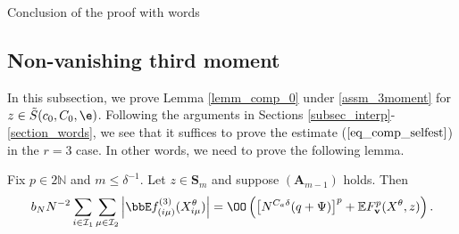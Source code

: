 \begin{subsection}{Conclusion of the proof with words}
\end{subsection}



\subsection{Non-vanishing third moment}\label{subsec_3moment}

In this subsection, we prove Lemma \ref{lemm_comp_0} under \eqref{assm_3moment} for $z\in \tilde S(c_0, C_0,\e)$. 
Following the arguments in Sections \ref{subsec_interp}-\ref{section_words}, we see that it suffices to prove the estimate ($\ref{eq_comp_selfest}$) in the $r=3$ case. In other words, we need to prove the following lemma. 
\begin{lemma}\label{lemm_comparison_big}
Fix $p\in 2\mathbb N$ and $m \le \delta^{-1}$. Let $z\in {\mathbf S}_m $ and suppose $(\mathbf A_{m-1})$ holds. Then %
\begin{equation}\label{eq_comp_selfest_generalX}
b_N N^{-2}\sum_{i\in\mathcal I_1}\sum_{\mu\in\mathcal I_2}\left|\bbE f^{(3)}_{(i\mu)}(X_{i\mu}^\theta)\right|=\OO\left(\left[N^{C_a\delta} (q+\Psi)\right]^p+\mathbb EF_{\mathbf v}^p(X^\theta,z)\right).
\end{equation}
\end{lemma}
